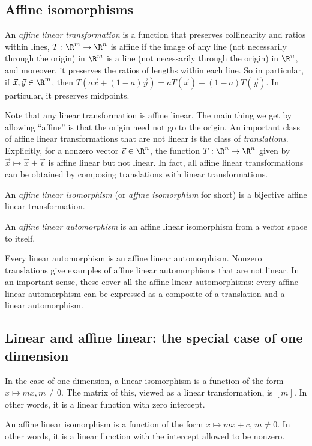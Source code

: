 \documentclass[10pt]{amsart}
\begin{document}
\subsection{Affine isomorphisms}

An {\em affine linear transformation} is a function that preserves
collinearity and ratios within lines, $T:\R^m \to \R^n$ is affine if
the image of any line (not necessarily through the origin) in $\R^m$
is a line (not necessarily through the origin) in $\R^n$, and
moreover, it preserves the ratios of lengths within each line. So in
particular, if $\vec{x},\vec{y} \in \R^m$, then $T(a\vec{x} + (1 -
a)\vec{y}) = aT(\vec{x}) + (1 - a)T(\vec{y})$. In particular, it
preserves midpoints.

Note that any linear transformation is affine linear. The main thing
we get by allowing ``affine'' is that the origin need not go to the
origin. An important class of affine linear transformations that are
not linear is the class of {\em translations}. Explicitly, for a
nonzero vector $\vec{v} \in \R^n$, the function $T:\R^n \to \R^n$
given by $\vec{x} \mapsto \vec{x} + \vec{v}$ is affine linear but not
linear. In fact, all affine linear transformations can be obtained by
composing translations with linear transformations.

An {\em affine linear isomorphism} (or {\em affine isomorphism} for
short) is a bijective affine linear transformation.

An {\em affine linear automorphism} is an affine linear isomorphism
from a vector space to itself.

Every linear automorphism is an affine linear automorphism. Nonzero
translations give examples of affine linear automorphisms that are not
linear. In an important sense, these cover all the affine linear
automorphisms: every affine linear automorphism can be expressed as a
composite of a translation and a linear automorphism.

\subsection{Linear and affine linear: the special case of one dimension}

In the case of one dimension, a linear isomorphism is a function of
the form $x \mapsto mx, m \ne 0$. The matrix of this, viewed as a
linear transformation, is $[m]$. In other words, it is a linear
function with zero intercept.

An affine linear isomorphism is a function of the form $x \mapsto mx +
c$, $m \ne 0$. In other words, it is a linear function with the
intercept allowed to be nonzero.
\end{document}
